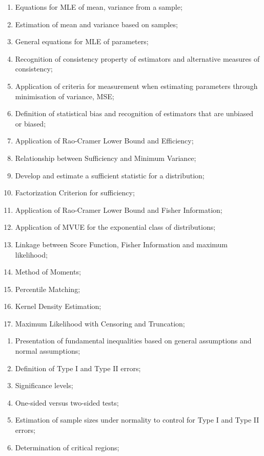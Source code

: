 \documentclass[12pt, titlepage, french]{report}
\begin{document}
\begin{outcomes}
\begin{enumerate}[label = \alph*.]
	\item	Equations for MLE of mean, variance from a sample;
	\item	Estimation of mean and variance based on samples;
	\item	General equations for MLE of parameters;
	\item	Recognition of consistency property of estimators and alternative measures of consistency;
	\item	Application of criteria for measurement when estimating parameters through minimisation of variance, MSE;
	\item	Definition of statistical bias and recognition of estimators that are unbiased or biased;
	\item	Application of Rao-Cramer Lower Bound and Efficiency;
	\item	Relationship between Sufficiency and Minimum Variance;
	\item	Develop and estimate a sufficient statistic for a distribution;
	\item	Factorization Criterion for sufficiency;
	\item	Application of Rao-Cramer Lower Bound and Fisher Information;
	\item	Application of MVUE for the exponential class of distributions;
	\item	Linkage between Score Function, Fisher Information and maximum likelihood;
	\item	Method of Moments;
	\item	Percentile Matching;
	\item	Kernel Density Estimation;
	\item	Maximum Likelihood with Censoring and Truncation;
\end{enumerate}
\tcbline
\begin{enumerate}[label = \alph*.]
	\item	Presentation of fundamental inequalities based on general assumptions and normal assumptions;
	\item	Definition of Type I and Type II errors;
	\item	Significance levels;
	\item	One-sided versus two-sided tests;
	\item	Estimation of sample sizes under normality to control for Type I and Type II errors;
	\item	Determination of critical regions;

\end{enumerate}
\end{outcomes}
\end{document}
